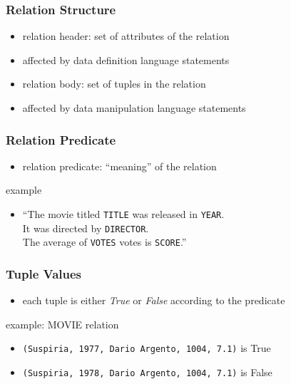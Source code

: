 \documentclass[dvipsnames]{beamer}
\theoremstyle{plain}
\begin{document}
\begin{frame}
  \frametitle{Relation Structure}

    \begin{itemize}
      \item relation header: set of attributes of the relation
      \item affected by data definition language statements

      \medskip
      \item relation body: set of tuples in the relation
      \item affected by data manipulation language statements
    \end{itemize}
\end{frame}

\begin{frame}
  \frametitle{Relation Predicate}

  \begin{itemize}
    \item \alert{relation predicate}: ``meaning'' of the relation
  \end{itemize}

  \medskip
  \begin{exampleblock}{example}
    \begin{itemize}
      \item ``The movie titled \texttt{TITLE} was released in \texttt{YEAR}.\\
	It was directed by \texttt{DIRECTOR}.\\
	The average of \texttt{VOTES} votes is \texttt{SCORE}.''
    \end{itemize}
  \end{exampleblock}
\end{frame}

\begin{frame}
  \frametitle{Tuple Values}

  \begin{itemize}
    \item each tuple is either \emph{True} or \emph{False} according to the
      predicate
  \end{itemize}
  
  \begin{exampleblock}{example: MOVIE relation}
    \begin{itemize}
      \item \texttt{(Suspiria, 1977, Dario Argento, 1004, 7.1)} is True
      \item \texttt{(Suspiria, 1978, Dario Argento, 1004, 7.1)} is False
    \end{itemize}
  \end{exampleblock}
\end{frame}
\end{document}
